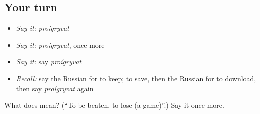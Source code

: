 \subsection*{Your turn}
\begin{itemize}
\raggedright
  \item \emph{Say it:} \emph{proígryvat}
  \item \emph{Say it:} \emph{proígryvat}, once more
  \item \emph{Say it:} say \emph{proígryvat}
  \item \emph{Recall:} say the Russian for to keep; to save, then the Russian for to download, then say \emph{proígryvat} again
\end{itemize}

\begin{tcolorbox}[breakable,colback=teal!4,colframe=teal!35!black,title={Before you move on}]
What does  mean? (\textquotedblleft{}To be beaten, to lose (a game)\textquotedblright{}.) Say it once more.
\end{tcolorbox}
